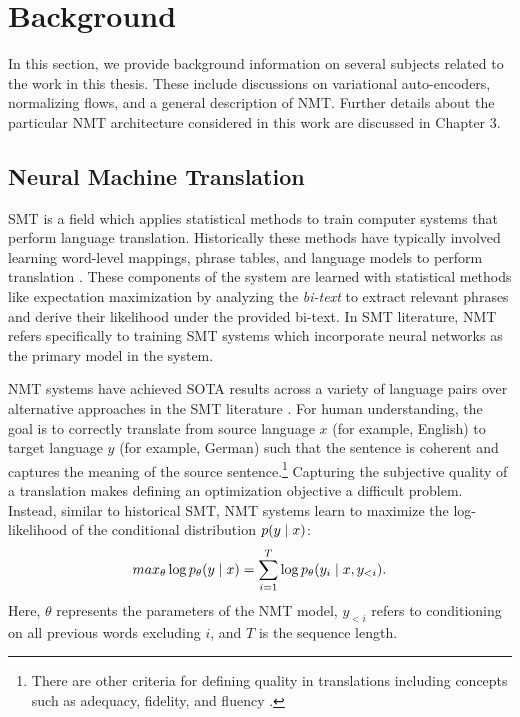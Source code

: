 \chapter{Background}
\label{ch:background}
In this section, we provide background information on several subjects related to the work in this thesis. These include discussions on variational auto-encoders, normalizing flows, and a general description of \ac{NMT}. Further details about the particular \ac{NMT} architecture considered in this work are discussed in Chapter 3. %



\section{Neural Machine Translation}
\label{section:neuralMT}

\ac{SMT} is a field which applies statistical methods to train computer systems that perform language translation. Historically these methods have typically involved learning word-level mappings, phrase tables, and language models to perform translation \cite{koehnSMT2010}. These components of the system are learned with statistical methods like expectation maximization by analyzing the \textit{bi-text} to extract relevant phrases and derive their likelihood under the provided bi-text.  In \ac{SMT} literature, \ac{NMT} refers specifically to training \ac{SMT} systems which incorporate neural networks as the primary model in the system. %

\ac{NMT} systems have achieved \ac{SOTA} results across a variety of language pairs over alternative approaches in the \ac{SMT} literature \cite{bahdanau2014NMTBYJoint,koehn2017NMT,vaswani2017attentionTransformer}. For human understanding, the goal is to correctly translate from source language $x$ (for example, English) to target language $y$ (for example, German) such that the sentence is coherent and captures the meaning of the source sentence.\footnote{There are other criteria for defining quality in translations including concepts such as adequacy, fidelity, and fluency \cite{Papineni2002BLEU,koehnSMT2010}.} Capturing the subjective quality of a translation makes defining an optimization  objective a difficult problem. Instead, similar to historical \ac{SMT}, \ac{NMT} systems learn to maximize the log-likelihood of the conditional distribution $p(y\; | \;{x})$: 
\begin{equation}
	max_{\theta} \log p_{\theta}(y \; | \;{x})  = \sum_{i=1}^{T} \log p_{\theta}(y_{i} \; | \;{x, y_{<i}}).
\end{equation}
Here, $\theta$ represents the parameters of the \ac{NMT} model, $y_{<i}$ refers to conditioning on all previous words excluding $i$, and $T$ is the sequence length. 

